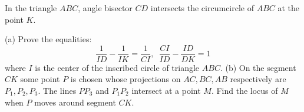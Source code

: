 In the triangle $ABC$, angle bisector $CD$ intersects the circumcircle of $ABC$ at the point $K$.

(a) Prove the equalities:
$$\frac1{ID}-\frac1{IK}=\frac1{CI},\enspace\frac{CI}{ID}-\frac{ID}{DK}=1$$where $I$ is the center of the inscribed circle of triangle $ABC$.
(b) On the segment $CK$ some point $P$ is chosen whose projections on $AC,BC,AB$ respectively are $P_1,P_2,P_3$. The lines $PP_3$ and $P_1P_2$ intersect at a point $M$. Find the locus of $M$ when $P$ moves around segment $CK$.
